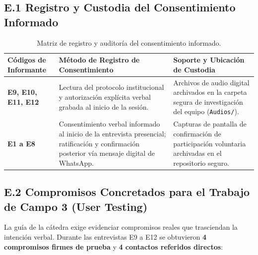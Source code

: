 \documentclass[11pt,a4paper]{article}
\begin{document}
\subsection{E.1 Registro y Custodia del Consentimiento Informado}
\begin{table}[!htbp]
\centering
\small
\renewcommand{\arraystretch}{1.15}
\begin{tabularx}{\textwidth}{p{3.2cm}p{5.5cm}X}
\toprule
\textbf{C\'odigos de Informante} & \textbf{M\'etodo de Registro de Consentimiento} & \textbf{Soporte y Ubicaci\'on de Custodia} \\
\midrule
\textbf{E9, E10, E11, E12} & Lectura del protocolo institucional y autorizaci\'on expl\'icita verbal grabada al inicio de la sesi\'on. & Archivos de audio digital archivados en la carpeta segura de investigaci\'on del equipo (\texttt{Audios/}). \\
\midrule
\textbf{E1 a E8} & Consentimiento verbal informado al inicio de la entrevista presencial; ratificaci\'on y confirmaci\'on posterior v\'ia mensaje digital de WhatsApp. & Capturas de pantalla de confirmaci\'on de participaci\'on voluntaria archivadas en el repositorio seguro. \\
\bottomrule
\end{tabularx}
\caption{Matriz de registro y auditor\'ia del consentimiento informado.}
\label{tab:evidencias_consentimiento}
\end{table}

\subsection{E.2 Compromisos Concretados para el Trabajo de Campo 3 (User Testing)}
La gu\'ia de la c\'atedra exige evidenciar compromisos reales que trasciendan la intenci\'on verbal. Durante las entrevistas E9 a E12 se obtuvieron \textbf{4 compromisos firmes de prueba} y \textbf{4 contactos referidos directos}:
\end{document}
